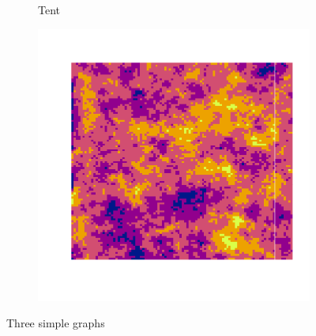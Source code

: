 \documentclass[10pt]{article} %
\begin{document}
\begin{figure}[h!]
\begin{subfigure}[b]{0.3\textwidth}
        \caption{Tent}
        \label{fig:three sin x}
    \end{subfigure}
    \hfill
    \begin{subfigure}[b]{0.3\textwidth}
        \centering
        \includegraphics[width=\textwidth]{media/exp6_1.png}
        \caption{}
        \label{fig:five over x}
    \end{subfigure}
       \caption{Three simple graphs}
       \label{fig:three graphs}
\end{figure}
\end{document}
